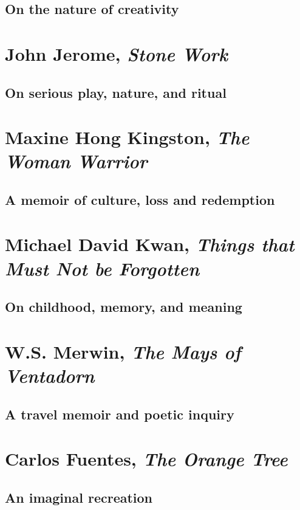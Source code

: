 \documentclass[letterpaper,oneside]{memoir}
\begin{document}
\begin{description}
\subsection{On the nature of creativity}
\newpage
\addtocounter{page}{+8}
\vspace*{5cm}
\section{John Jerome, \textit{Stone Work}}
\subsection{On serious play, nature, and ritual}
\newpage
\addtocounter{page}{+7}
\vspace*{5cm}
\section{Maxine Hong Kingston, \textit{The Woman Warrior}}
\subsection{A memoir of culture, loss and redemption}
\newpage
\addtocounter{page}{+9}
\vspace*{5cm}
\section{Michael David Kwan, \textit{Things that Must Not be Forgotten}}
\subsection{On childhood, memory, and meaning}
\newpage
\addtocounter{page}{+9}
\vspace*{5cm}
\section{W.S. Merwin, \textit{The Mays of Ventadorn}}
\subsection{A travel memoir and poetic inquiry}
\newpage
\addtocounter{page}{+16}
\vspace*{5cm}
\section{Carlos Fuentes, \textit{The Orange Tree}}
\subsection{An imaginal recreation}
\newpage
\addtocounter{page}{+10}
\vspace*{5cm}

\end{description}
\end{document}
